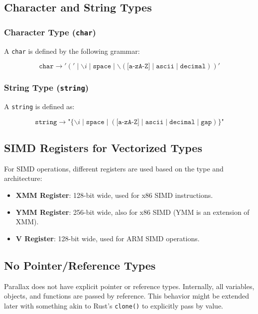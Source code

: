 \documentclass{article}
\begin{document}
\subsection{Character and String Types}

\subsubsection{Character Type (\texttt{char})}

A \texttt{char} is defined by the following grammar:

\[
\texttt{char} \rightarrow ' (' \mid \backslash i \mid \texttt{space} \mid \backslash (\texttt{[a-zA-Z]} \mid \texttt{ascii} \mid \texttt{decimal})) '
\]

\subsubsection{String Type (\texttt{string})}

A \texttt{string} is defined as:

\[
\texttt{string} \rightarrow \texttt{"} \{ \backslash i \mid \texttt{space} \mid (\texttt{[a-zA-Z]} \mid \texttt{ascii} \mid \texttt{decimal} \mid \texttt{gap}) \} \texttt{"}
\]

\subsection{SIMD Registers for Vectorized Types}

For SIMD operations, different registers are used based on the type and architecture:
\begin{itemize}
    \item \textbf{XMM Register}: 128-bit wide, used for x86 SIMD instructions.
    \item \textbf{YMM Register}: 256-bit wide, also for x86 SIMD (YMM is an extension of XMM).
    \item \textbf{V Register}: 128-bit wide, used for ARM SIMD operations.
\end{itemize}

\subsection{No Pointer/Reference Types}

Parallax does not have explicit pointer or reference types. Internally, all variables, objects, and functions are passed by reference. This behavior might be extended later with something akin to Rust’s \texttt{clone()} to explicitly pass by value.
\end{document}
